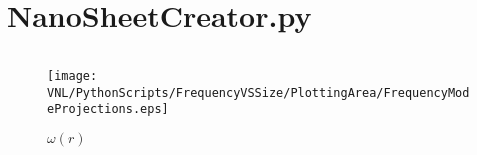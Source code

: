 
\appendix
\appendixpage
\addappheadtotoc
\section{NanoSheetCreator.py}
\label{NSCstart}
\inputminted[python3=true,bgcolor=Black,linenos=true]{python}{VNL/PythonScripts/NanoSheetCreator.py}
\label{NSCend}
\begin{figure}
  \texttt{[image: VNL/PythonScripts/FrequencyVSSize/PlottingArea/FrequencyModeProjections.eps]}
  \caption{$\omega(r)$}
  \label{OR}
\end{figure}
\newpage
